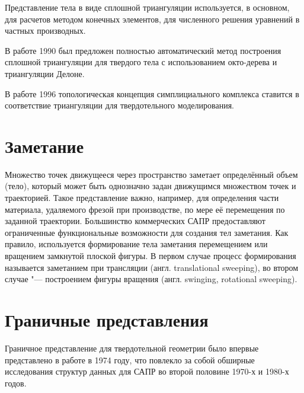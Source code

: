 Представление тела в виде сплошной триангуляции используется, в основном, для расчетов методом конечных элементов, для численного решения уравнений в частных производных.

В работе \cite{schroeder1990} 1990 был предложен полностью автоматический метод построения сплошной триангуляции для твердого тела с использованием окто-дерева и триангуляции Делоне.

В работе \cite{edelsbrunner1994} 1996 топологическая концепция симплициального комплекса ставится в соответствие триангуляции для твердотельного моделирования. 

\section{Заметание} \label{sect_sweeping}

Множество точек движущееся через пространство заметает определённый объем (тело), который может быть однозначно задан движущимся множеством точек и траекторией. Такое представление важно, например, для определения части материала, удаляемого фрезой при производстве, по мере её перемещения по заданной траектории. Большинство коммерческих САПР предоставляют ограниченные функциональные возможности для создания тел заметания. Как правило, используется формирование тела заметания перемещением или вращением замкнутой плоской фигуры. В первом случае процесс формирования называется заметанием при трансляции (англ. translational sweeping), во втором случае "--- построением фигуры вращения (англ. swinging, rotational sweeping).

\section{Граничные представления} \label{sect_boundary_rep}

Граничное представление для твердотельной геометрии было впервые представлено в работе \cite{Braid74} в 1974 году, что повлекло за собой обширные исследования структур данных для САПР во второй половине 1970-х и 1980-х годов.

